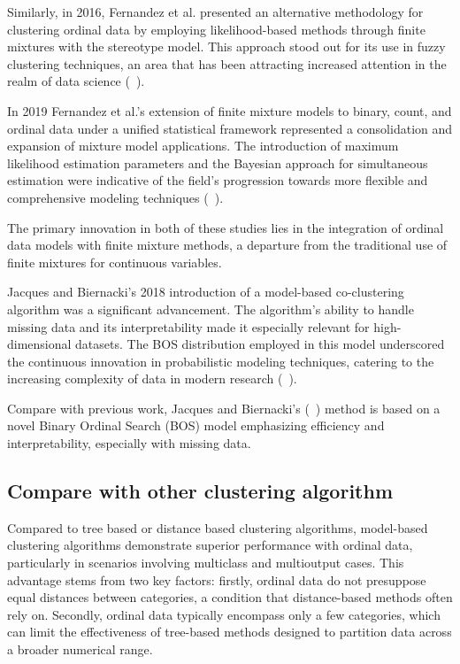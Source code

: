 \documentclass{article}
\begin{document}
Similarly, in 2016, Fernandez et al. presented an alternative methodology for clustering ordinal data by employing likelihood-based methods through finite mixtures with the stereotype model. This approach stood out for its use in fuzzy clustering techniques, an area that has been attracting increased attention in the realm of data science (~\cite{fernandez2016mixture}).

In 2019 Fernandez et al.'s extension of finite mixture models to binary, count, and ordinal data under a unified statistical framework represented a consolidation and expansion of mixture model applications. The introduction of maximum likelihood estimation parameters and the Bayesian approach for simultaneous estimation were indicative of the field's progression towards more flexible and comprehensive modeling techniques (~\cite{fernandez2019finite}).

The primary innovation in both of these studies lies in the integration of ordinal data models with finite mixture methods, a departure from the traditional use of finite mixtures for continuous variables.


Jacques and Biernacki's 2018 introduction of a model-based co-clustering algorithm was a significant advancement. The algorithm's ability to handle missing data and its interpretability made it especially relevant for high-dimensional datasets. The BOS distribution employed in this model underscored the continuous innovation in probabilistic modeling techniques, catering to the increasing complexity of data in modern research (~\cite{jacques2018model}).

Compare with previous work, Jacques and Biernacki's (~\cite{jacques2018model}) method is based on a novel Binary Ordinal Search (BOS) model emphasizing efficiency and interpretability, especially with missing data. 

\subsection{Compare with other clustering algorithm}

Compared to tree based or distance based clustering algorithms, model-based clustering algorithms demonstrate superior performance with ordinal data, particularly in scenarios involving multiclass and multioutput cases. 
This advantage stems from two key factors: firstly, ordinal data do not presuppose equal distances between categories, a condition that distance-based methods often rely on. Secondly, ordinal data typically encompass only a few categories, which can limit the effectiveness of tree-based methods designed to partition data across a broader numerical range.
\end{document}
